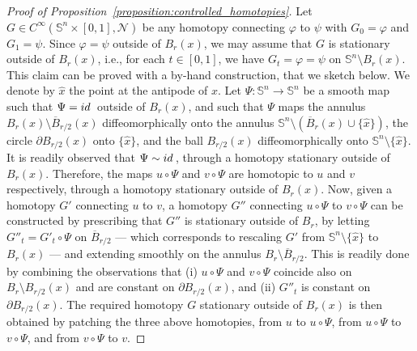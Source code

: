 \documentclass[12pt]{amsart}
\def\id{{\rm id\, }}
\def\n{{\mathcal N}}
\def\n{{\mathcal{M}}}
\def\n{{\mathcal N}}
\def\S{{\mathbb S}}
\numberwithin{theorem}{section} \numberwithin{equation}{section}
\begin{document}
\begin{proof}[Proof of Proposition~\ref{proposition:controlled_homotopies}]
	Let $ G \in C^{\infty}(\S^n\times[0,1],\n)$ be any homotopy connecting $ \varphi $ to $ \psi $ with $G_0 = \varphi$ and $G_1 = \psi$.
	Since $ \varphi = \psi $ outside of $ B_r(x)  $, we may assume that $ G $ is stationary outside of $ B_r(x)  $, i.e., for each $t\in[0,1]$, we have $G_t= \varphi = \psi$ on $\S^n \setminus B_r(x)$.
	This claim can be proved with a by-hand construction, that we sketch below.
	We denote by \( \hat{x} \) the point at the antipode of \( x \).
	Let \( \Psi \colon \S^{n} \to \S^{n} \) be a smooth map such that \( \Psi = \id \) outside of \( B_{r}(x) \), and such that \( \Psi \) maps the annulus \( B_{r}(x) \setminus \overline{B}_{r/2}(x) \) diffeomorphically onto the annulus \( \S^{n} \setminus (\overline{B}_{r}(x) \cup \{\hat{x}\}) \), the circle \( \partial B_{r/2}(x) \) onto \( \{\hat{x}\} \), and the ball \( B_{r/2}(x) \) diffeomorphically onto \( \S^{n} \setminus \{\hat{x}\} \).
	It is readily observed that \( \Psi \sim \id \), through a homotopy stationary outside of \( B_{r}(x) \).
	Therefore, the maps \( u \circ \Psi \) and \( v \circ \Psi \) are homotopic to \( u \) and \( v \) respectively, through a homotopy stationary outside of \( B_{r}(x) \).
	Now, given a homotopy \( G' \) connecting \( u \) to \( v \), a homotopy \( G'' \) connecting \( u \circ \Psi \) to \( v \circ \Psi \) can be constructed by prescribing that \( G'' \) is stationary outside of \( B_{r} \), by letting \( G''_{t} = G'_{t} \circ \Psi \) on \( \overline{B}_{r/2} \) --- which corresponds to rescaling \( G' \) from \( \S^{n} \setminus \{ \hat{x} \}\) to \( B_{r}(x) \) --- and extending smoothly on the annulus \( B_{r} \setminus \overline{B}_{r/2} \).
	This is readily done by combining the observations that (i) \( u \circ \Psi \) and \( v \circ \Psi \) coincide also on \( B_{r} \setminus B_{r/2}(x) \) and are constant on \( \partial B_{r/2}(x) \), and (ii) \( G''_{t} \) is constant on \( \partial B_{r/2}(x) \).
	The required homotopy \( G \) stationary outside of $ B_r(x)  $ is then obtained by patching the three above homotopies, from \( u \) to \( u \circ \Psi \), from \( u \circ \Psi \) to \( v \circ \Psi \), and from \( v \circ \Psi \) to \( v \).
	

\end{proof}
\end{document}
